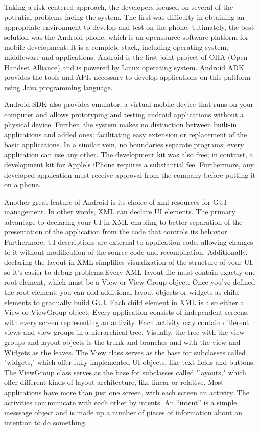 \documentclass[acmtocl]{acmtrans2m}
\begin{document}
Taking a risk centered approach, the developers focused on several of the potential problems facing the system.  The first was difficulty in obtaining an appropriate environment to develop and test on the phone.  Ultimately, the best solution was the Android phone, which is an opensource software platform for mobile development. It is a complete stack, including operating system, middleware and applications.  Android is the first joint project of OHA (Open Handset Alliance) and is powered by Linux operating system. Android ADK provides the tools and APIs necessary to develop applications on this paltform using Java programming language.

Android SDK also provides emulator, a virtual mobile device that runs on your computer and allows prototyping and testing android applications without a physical device.  Further, the system makes no distinction between built-in applications and added ones; facilitating easy extension or replacement of the basic applications.  In a similar vein, no boundaries separate programs; every application can use any other.  The development kit was also free; in contrast, a development kit for Apple's iPhone requires a substantial fee.  Furthermore, any developed application must receive approval from the company before putting it on a phone.  

Another great feature of Android is its choice of xml resources for GUI management. In other words, XML can declare UI elements. The primary advantage to declaring your UI in XML enabling to better separation of the presentation of the application from the code that controls its behavior. Furthermore, UI descriptions are external to application code, allowing changes to it without modification of the source code and recompilation. Additionally, declaring the layout in XML simplifies visualization of the structure of your UI, so it's easier to debug problems.Every XML layout file must contain exactly one root element, which must be a View or View Group object.  Once you've defined the root element, you can add additional layout objects or widgets as child elements to gradually build GUI. Each child element in XML is also either a View or ViewGroup object.
Every application consists of independent screens, with every screen representing an activity. Each activity may contain different views and view groups in a hierarchical tree. Visually, the tree with the view groups and layout objects is the trunk and branches and with the view and Widgets as the leaves. The View class serves as the base for subclasses called "widgets," which offer fully implemented UI objects, like text fields and buttons. The ViewGroup class serves as the base for subclasses called "layouts," which offer different kinds of layout architecture, like linear or relative.
Most applications have more than just one screen, with each screen an activity.    The activities communicate with each other by intents. An “intent” is a simple messsage object and is made up a number of pieces of information about an intention to do something.
\end{document}

